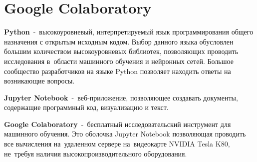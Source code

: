 \section{Google Colaboratory}\label{section:google_colab}

\textbf{Python}\cite{bib:python}~-~высокоуровневый, интерпретируемый язык программирования общего назначения с открытым исходным кодом.
Выбор данного языка обусловлен большим количеством высокоуровневых библиотек, позволяющих проводить исследования в~области машинного обучения и нейронных сетей.
Большое сообщество разработчиков на языке Python позволяет находить ответы на возникающие вопросы\cite{bib:why_python}.

\textbf{Jupyter Notebook}\cite{bib:jupyter}~-~веб-приложение, позволяющее создавать документы, содержащие программный код, визуализацию и текст.

\textbf{Google Colaboratory}\cite{bib:colab_settings}~-~бесплатный исследовательский инструмент для машинного обучения.
Это оболочка Jupyter Notebook позволяющая проводить все вычисления на~удаленном сервере на~видеокарте NVIDIA Tesla K80\cite{bib:nvidia_k80}, не~требуя наличия высокопроизводительного оборудования.

\newpage

